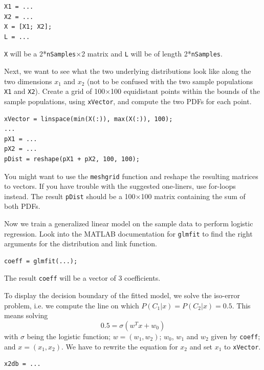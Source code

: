 \documentclass[10pt,a4paper,notitlepage]{report}
\begin{document}
\begin{verbatim}
X1 = ...
X2 = ...
X = [X1; X2];
L = ...
\end{verbatim}

\texttt{X} will be a 2*\texttt{nSamples}$\times$2 matrix and \texttt{L} will be of length 2*\texttt{nSamples}.

Next, we want to see what the two underlying distributions look like along the two dimensions $x_1$ and $x_2$ (not to be confused with the two sample populations \texttt{X1} and \texttt{X2}). Create a grid of 100$\times$100 equidistant points within the bounds of the sample populations, using \texttt{xVector}, and compute the two PDFs for each point.

\begin{verbatim}
xVector = linspace(min(X(:)), max(X(:)), 100);
...
pX1 = ...
pX2 = ...
pDist = reshape(pX1 + pX2, 100, 100);
\end{verbatim}

You might want to use the \texttt{meshgrid} function and reshape the resulting matrices to vectors. If you have trouble with the suggested one-liners, use for-loops instead. The result \texttt{pDist} should be a 100$\times$100 matrix containing the sum of both PDFs.

Now we train a generalized linear model on the sample data to perform logistic regression. Look into the MATLAB documentation for \texttt{glmfit} to find the right arguments for the distribution and link function.

\begin{verbatim}
coeff = glmfit(...);
\end{verbatim}

The result \texttt{coeff} will be a vector of 3 coefficients.

To display the decision boundary of the fitted model, we solve the iso-error problem, i.e. we compute the line on which $P(C_1|x) = P(C_2|x) = 0.5$. This means solving
\begin{equation*}
0.5 = \sigma (w^Tx+w_0)
\end{equation*}
with $\sigma$ being the logistic function; $w=(w_1,w_2)$; $w_0$, $w_1$ and $w_2$ given by \texttt{coeff}; and $x=(x_1,x_2)$. We have to rewrite the equation for $x_2$ and set $x_1$ to \texttt{xVector}.

\begin{verbatim}
x2db = ...
\end{verbatim}
\end{document}
